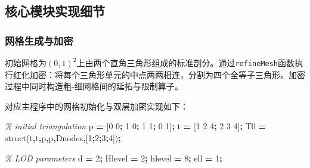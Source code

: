 \documentclass[
]{article}
\newenvironment{Shaded}{\begin{snugshade}}{\end{snugshade}}
\newcommand{\CommentTok}[1]{\textcolor[rgb]{0.56,0.35,0.01}{\textit{#1}}}
\newcommand{\FloatTok}[1]{\textcolor[rgb]{0.00,0.00,0.81}{#1}}
\newcommand{\NormalTok}[1]{#1}
\newcommand{\OperatorTok}[1]{\textcolor[rgb]{0.81,0.36,0.00}{\textbf{#1}}}
\newcommand{\SpecialStringTok}[1]{\textcolor[rgb]{0.31,0.60,0.02}{#1}}
\newcommand{\VariableTok}[1]{\textcolor[rgb]{0.00,0.00,0.00}{#1}}
\begin{document}
\subsection{核心模块实现细节}\label{chap-5-2}

\subsubsection{网格生成与加密}\label{ux7f51ux683cux751fux6210ux4e0eux52a0ux5bc6}

初始网格为\((0,1)^2\)上由两个直角三角形组成的标准剖分。通过\texttt{refineMesh}函数执行红化加密：将每个三角形单元的中点两两相连，分割为四个全等子三角形。加密过程中同时构造粗-细网格间的延拓与限制算子。

对应主程序中的网格初始化与双层加密实现如下：

\begin{Shaded}
\begin{Highlighting}[]
\CommentTok{\% initial triangulation}
\VariableTok{p} \OperatorTok{=}\NormalTok{ [}\FloatTok{0} \FloatTok{0}\OperatorTok{;} \FloatTok{1} \FloatTok{0}\OperatorTok{;} \FloatTok{1} \FloatTok{1}\OperatorTok{;} \FloatTok{0} \FloatTok{1}\NormalTok{]}\OperatorTok{;}
\VariableTok{t} \OperatorTok{=}\NormalTok{ [}\FloatTok{1} \FloatTok{2} \FloatTok{4}\OperatorTok{;} \FloatTok{2} \FloatTok{3} \FloatTok{4}\NormalTok{]}\OperatorTok{;}
\VariableTok{T0} \OperatorTok{=} \VariableTok{struct}\NormalTok{(}\SpecialStringTok{\textquotesingle{}t\textquotesingle{}}\OperatorTok{,}\VariableTok{t}\OperatorTok{,}\SpecialStringTok{\textquotesingle{}p\textquotesingle{}}\OperatorTok{,}\VariableTok{p}\OperatorTok{,}\SpecialStringTok{\textquotesingle{}Dnodes\textquotesingle{}}\OperatorTok{,}\NormalTok{[}\FloatTok{1}\OperatorTok{;}\FloatTok{2}\OperatorTok{;}\FloatTok{3}\OperatorTok{;}\FloatTok{4}\NormalTok{])}\OperatorTok{;}

\CommentTok{\% LOD parameters}
\VariableTok{d} \OperatorTok{=} \FloatTok{2}\OperatorTok{;}
\VariableTok{Hlevel} \OperatorTok{=} \FloatTok{2}\OperatorTok{;}
\VariableTok{hlevel} \OperatorTok{=} \FloatTok{8}\OperatorTok{;}
\VariableTok{ell} \OperatorTok{=} \FloatTok{1}\OperatorTok{;}


\end{Highlighting}
\end{Shaded}
\end{document}
